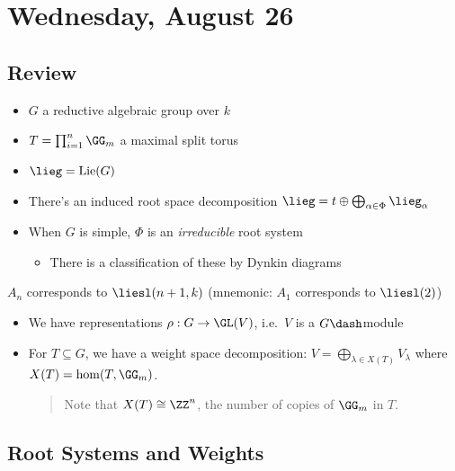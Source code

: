 \hypertarget{wednesday-august-26}{%
\section{Wednesday, August 26}\label{wednesday-august-26}}

\hypertarget{review}{%
\subsection{Review}\label{review}}

\begin{itemize}
\tightlist
\item
  \(G\) a reductive algebraic group over \(k\)
\item
  \(T = \prod_{i=1}^n \GG_m\) a maximal split torus
\item
  \(\lieg = \mathrm{Lie}(G)\)
\item
  There's an induced root space decomposition
  \(\lieg = t\oplus \bigoplus_{\alpha\in \Phi}\lieg_\alpha\)
\item
  When \(G\) is simple, \(\Phi\) is an \emph{irreducible} root system

  \begin{itemize}
  \tightlist
  \item
    There is a classification of these by Dynkin diagrams
  \end{itemize}
\end{itemize}

\begin{example}

\(A_n\) corresponds to \(\liesl(n+1, k)\) (mnemonic: \(A_1\) corresponds
to \(\liesl(2)\))

\end{example}

\begin{itemize}
\item
  We have representations \(\rho: G\to \GL(V)\), i.e.~\(V\) is a
  \(G\dash\)module
\item
  For \(T\subseteq G\), we have a weight space decomposition:
  \(V = \bigoplus_{\lambda \in X(T)} V_\lambda\) where
  \(X(T) = \hom(T, \GG_m)\).

  \begin{quote}
  Note that \(X(T) \cong \ZZ^n\), the number of copies of \(\GG_m\) in
  \(T\).
  \end{quote}
\end{itemize}

\hypertarget{root-systems-and-weights}{%
\subsection{Root Systems and Weights}\label{root-systems-and-weights}}

